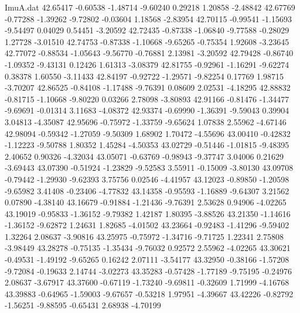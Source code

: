 \begin{filecontents}{ImuA.dat}
  42.65417   -0.60538   -1.48714   -9.60240    0.29218    1.20858   -2.48842
  42.67769   -0.77288   -1.39262   -9.72802   -0.03604    1.18568   -2.83954
  42.70115   -0.99541   -1.15693   -9.54497    0.04029    0.54451   -3.20592
  42.72435   -0.87338   -1.06840   -9.77588   -0.28029    1.27728   -3.01510
  42.74753   -0.87338   -1.10668   -9.65265   -0.75354    1.92608   -3.23645
  42.77072   -0.88534   -1.05643   -9.56770   -0.76881    2.13981   -3.20592
  42.79428   -0.86740   -1.09352   -9.43131    0.12426    1.61313   -3.08379
  42.81755   -0.92961   -1.16291   -9.62274    0.38378    1.60550   -3.11433
  42.84197   -0.92722   -1.29571   -9.82254    0.17769    1.98715   -3.70207
  42.86525   -0.84108   -1.17488   -9.76391    0.08609    2.02531   -4.18295
  42.88832   -0.81715   -1.10668   -9.80220    0.03266    2.78098   -3.80893
  42.91166   -0.81476   -1.34477   -9.69691   -0.01314    3.11683   -4.08372
  42.93374   -0.69990   -1.36391   -9.59043    0.39904    3.04813   -4.35087
  42.95696   -0.75972   -1.33759   -9.65624    1.07838    2.55962   -4.67146
  42.98094   -0.59342   -1.27059   -9.50309    1.68902    1.70472   -4.55696
  43.00410   -0.42832   -1.12223   -9.50788    1.80352    1.45284   -4.50353
  43.02729   -0.51446   -1.01815   -9.48395    2.40652    0.90326   -4.32034
  43.05071   -0.63769   -0.98943   -9.37747    3.04006    0.21629   -3.69443
  43.07390   -0.51924   -1.23829   -9.52583    3.55911   -0.15009   -3.80130
  43.09708   -0.79442   -1.29930   -9.62393    3.75756    0.02546   -4.41957
  43.12023   -0.89850   -1.20598   -9.65982    3.41408   -0.23406   -4.77832
  43.14358   -0.95593   -1.16889   -9.64307    3.21562    0.07890   -4.38140
  43.16679   -0.91884   -1.21436   -9.76391    2.53628    0.94906   -4.02265
  43.19019   -0.95833   -1.36152   -9.79382    1.42187    1.80395   -3.88526
  43.21350   -1.14616   -1.36152   -9.62872    1.24631    1.82685   -4.01502
  43.23664   -0.92483   -1.41296   -9.59402    1.32264    2.08637   -3.90816
  43.25975   -0.75972   -1.34716   -9.71725    1.22341    2.75808   -3.98449
  43.28278   -0.75135   -1.35434   -9.76032    0.92572    2.55962   -4.02265
  43.30621   -0.49531   -1.49192   -9.65265    0.16242    2.07111   -3.54177
  43.32950   -0.38166   -1.57208   -9.72084   -0.19633    2.14744   -3.02273
  43.35283   -0.57428   -1.77189   -9.75195   -0.24976    2.08637   -3.67917
  43.37600   -0.67119   -1.73240   -9.69811   -0.32609    1.71999   -4.16768
  43.39883   -0.64965   -1.59003   -9.67657   -0.53218    1.97951   -4.39667
  43.42226   -0.82792   -1.56251   -9.88595   -0.65431    2.68938   -4.70199

\end{filecontents}
